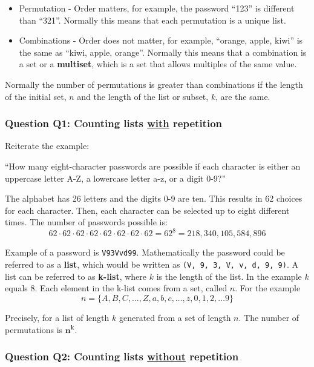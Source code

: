\documentclass{article}
\begin{document}
\begin{itemize}
    \item Permutation - Order matters, for example, the password ``123'' is different than ``321''. Normally this means that each permutation is a unique list.
    \item Combinations - Order does not matter, for example, ``orange, apple, kiwi'' is the same as ``kiwi, apple, orange''. Normally this means that a combination is a set or a \textbf{multiset}, which is a set that allows multiples of the same value.
\end{itemize}

Normally the number of permutations is greater than combinations if the length of the initial set, $n$ and the length of the list or subset, $k$, are the same.

\subsubsection{Question Q1: Counting lists \underline{with} repetition}

Reiterate the example: 
\begin{center}
``How many eight-character passwords are possible if each character is either an uppercase letter A-Z, a lowercase letter a-z, or a digit 0-9?''
\end{center} 
The alphabet has 26 letters and the digits 0-9 are ten. This results in 62 choices for each character. Then, each character can be selected up to eight different times. The number of passwords possible is:
\begin{equation*}
    62 \cdot 62 \cdot 62 \cdot 62 \cdot 62 \cdot 62 \cdot 62 \cdot 62 = 62^{8} = 218,340,105,584,896
\end{equation*}

Example of a password is \texttt{V93Vvd99}. Mathematically the password could be referred to as a \textbf{list}, which would be written as \texttt{(V, 9, 3, V, v, d, 9, 9)}. A list can be referred to as \textbf{k-list}, where $k$ is the length of the list. In the example $k$ equals 8. Each element in the k-list comes from a set, called $n$. For the example
\begin{equation*}
n = \{A, B, C, \dots, Z, a, b, c, \dots, z, 0, 1, 2, \dots 9\}
\end{equation*}

Precisely, for a list of length $k$ generated from a set of length $n$. The number of permutations is $\mathbf{n^k}$.

\subsubsection{Question Q2: Counting lists \underline{without} repetition}
\end{document}

